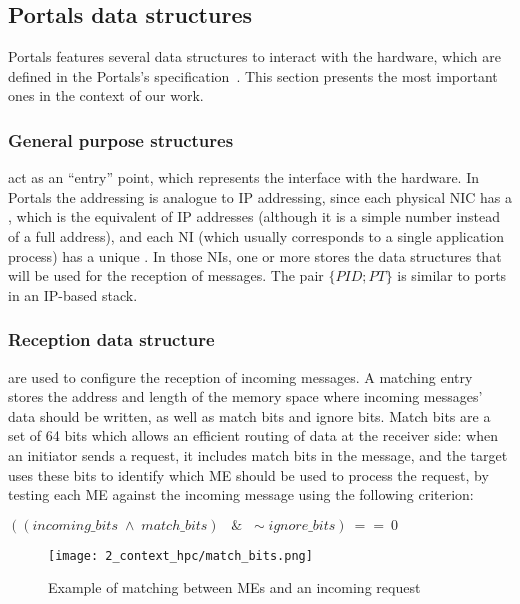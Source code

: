 \subsection{Portals data structures}

Portals features several data structures to interact with the hardware, which
are defined in the Portals's specification~\cite{Brightwell2022}. This section
presents the most important ones in the context of our work.

\subsubsection{General purpose structures}

 act as an ``entry'' point, which represents
the interface with the hardware. In Portals the addressing is analogue to IP
addressing, since each physical NIC has a ,
which is the equivalent of IP addresses (although it is a simple number instead
of a full address), and each NI (which usually corresponds to a single
application process) has a unique . In
those NIs, one or more  stores the data structures
that will be used for the reception of messages. The pair $\{PID ; PT\}$ is
similar to ports in an IP-based stack.

\subsubsection{Reception data structure}

 are used to configure the reception of
incoming messages. A matching entry stores the address and length of the memory
space where incoming messages' data should be written, as well as match bits and
ignore bits. Match bits are a set of 64 bits which allows an efficient routing
of data at the receiver side: when an initiator sends a request, it includes
match bits in the message, and the target uses these bits to identify which ME
should be used to process the request, by testing each ME against the incoming
message using the following criterion:

\begin{center}
    $((incoming\_bits \; \wedge \; match\_bits) \;\;\; \& \;\; \sim\!ignore\_bits) \: == \: 0$
\end{center}

\begin{figure}[!ht]
    \centering
    \texttt{[image: 2\_context\_hpc/match\_bits.png]}
    \caption{Example of matching between MEs and an incoming request}
    \label{fig:2_context_hpc:matching}
\end{figure}

